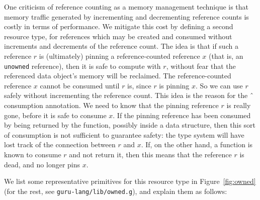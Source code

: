 \documentclass[9pt,natbib]{sigplanconf}
\begin{document}
One criticism of reference counting as a memory management technique
is that memory traffic generated by incrementing and decrementing
reference counts is costly in terms of performance.  We mitigate this
cost by defining a second resource type, for references which may be
created and consumed without increments and decrements of the
reference count.  The idea is that if such a reference $r$ is
(ultimately) pinning a reference-counted reference $x$ (that is, an
\texttt{unowned} reference), then it is safe to compute with $r$,
without fear that the referenced data object's memory will be
reclaimed.  The reference-counted reference $x$ cannot be consumed
until $r$ is, since $r$ is pinning $x$.  So we can use $r$ safely
without incrementing the reference count.  This idea is the reason for
the \^{\ } consumption annotation.  We need to know that the
pinning reference $r$ is really gone, before it is safe to consume
$x$.  If the pinning reference has been consumed by being returned by
the function, possibly inside a data structure, then this sort of
consumption is not sufficient to guarantee safety: the type system
will have lost track of the connection between $r$ and $x$.  If, on
the other hand, a function is known to consume $r$ and not return it,
then this means that the reference $r$ is dead, and no longer pins
$x$.

We list some representative primitives for this resource type in
Figure~\ref{fig:owned} (for the rest, see
\texttt{guru-lang/lib/owned.g}), and explain them as follows:
\end{document}
